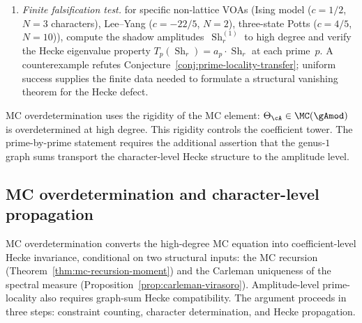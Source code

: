 \begin{remark}
\begin{enumerate}[label=\textup{(\Alph*)}]
\item \emph{Finite falsification test.}
 for specific non-lattice VOAs (Ising model ($c = 1/2$,
 $N = 3$ characters), Lee--Yang ($c = -22/5$, $N = 2$),
 three-state Potts ($c = 4/5$, $N = 10$)), compute the
 shadow amplitudes~$\operatorname{Sh}_r^{(1)}$ to high
 degree and verify the Hecke eigenvalue property
 $T_p(\operatorname{Sh}_r) = a_p \cdot \operatorname{Sh}_r$
 at each prime~$p$.
 A counterexample refutes
 Conjecture~\ref{conj:prime-locality-transfer};
 uniform success supplies the finite data needed to formulate a
 structural vanishing theorem for the Hecke defect.
\end{enumerate}

\noindent
MC overdetermination uses the rigidity of the MC element:
$\Theta_\cA \in \MC(\gAmod)$ is overdetermined at high degree. This
rigidity controls the coefficient tower. The prime-by-prime
statement requires the additional assertion that the genus-$1$ graph
sums transport the character-level Hecke structure to the amplitude
level.
\end{remark}

\subsection{MC overdetermination and
character-level propagation}%
\label{subsec:route-c-development}%
%
%

MC overdetermination converts the high-degree MC equation into
coefficient-level Hecke invariance, conditional on two structural
inputs: the MC recursion
(Theorem~\ref{thm:mc-recursion-moment}) and the Carleman
uniqueness of the spectral measure
(Proposition~\ref{prop:carleman-virasoro}). Amplitude-level
prime-locality also requires graph-sum Hecke compatibility. The
argument proceeds in three steps: constraint counting, character
determination, and Hecke propagation.

